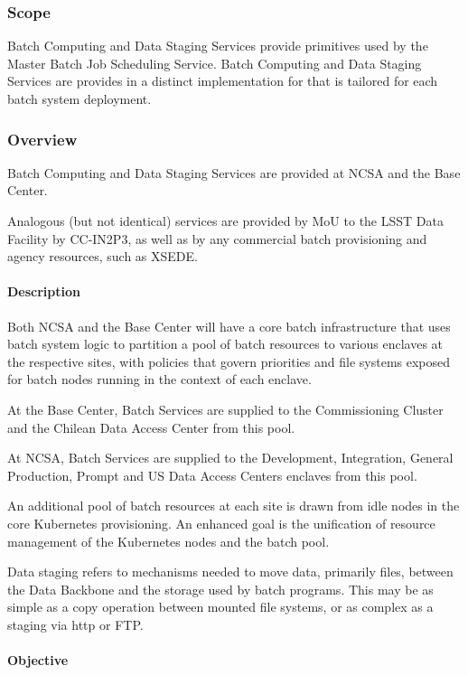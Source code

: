 \subsubsection{Scope}

Batch Computing and Data Staging Services provide primitives
used by the Master Batch Job Scheduling Service. Batch Computing
and Data Staging Services are provides in a distinct implementation
for that is tailored for each batch system deployment.

\subsubsection{Overview}

Batch Computing and Data Staging Services are provided at NCSA and the Base Center.

Analogous (but not identical) services are provided by MoU to the LSST
Data Facility by CC-IN2P3, as well as by any commercial batch
provisioning and agency resources, such as XSEDE.

\paragraph{Description}

Both NCSA and the Base Center will have a core batch infrastructure that
uses batch system logic to partition a pool of batch resources to
various enclaves at the respective sites, with policies that govern
priorities and file systems exposed for batch nodes running in the
context of each enclave.

At the Base Center, Batch Services are supplied to the Commissioning
Cluster and the Chilean Data Access Center from this pool.

At NCSA, Batch Services are supplied to the Development, Integration,
General Production, Prompt and US Data Access Centers enclaves from this pool.

An additional pool of batch resources at each site is drawn from idle nodes
in the core Kubernetes provisioning. An enhanced goal is the unification of
resource management of the Kubernetes nodes and the batch pool.

Data staging refers to mechanisms needed to move data, primarily files, between the
Data Backbone and the storage used by batch programs. This may be as simple
as a copy operation between mounted file systems, or as complex as a staging
via http or FTP.

\paragraph{Objective}

